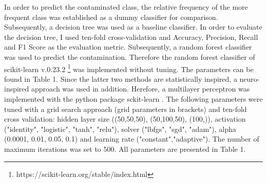 \documentclass{svproc}
\begin{document}
In order to predict the contaminated class, the relative frequency of the more frequent class was established as a dummy classifier for comparison. Subsequently, a decision tree was used as a baseline classifier. In order to evaluate the decision tree, I used ten-fold cross-validation and Accuracy, Precision, Recall and F1 Score as the evaluation metric.
Subsequently, a random forest classifier was used to predict the contamination. Therefore the random forest classifier of scikit-learn v.0.23.2 \footnote{https://scikit-learn.org/stable/index.html} was implemented without tuning. The parameters can be found in Table 1. Since the latter two methods are statistically inspired, a neuro-inspired approach was used in addition. Herefore, a multilayer perceptron was implemented with the python package sckit-learn . The following parameters  were tuned with a grid search approach (grid parameters in brackets) and ten-fold cross validation: hidden layer size ((50,50,50), (50,100,50), (100,)), activation ("identity", "logistic", "tanh", "relu"), solver ("lbfgs", "sgd", "adam"), alpha (0.0001, 0.01, 0.05, 0.1) and learning rate ("constant","adaptive"). The number of maximum iterations was set to 500. All parameters are presented in Table 1.
\end{document}
